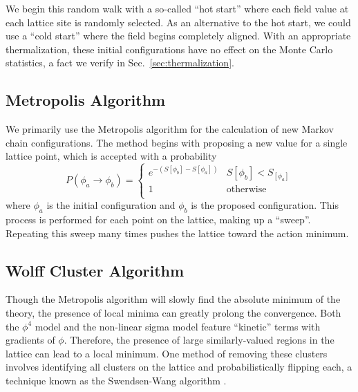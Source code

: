We begin this random walk with a so-called ``hot start'' where each field value at each lattice site is randomly selected. As an alternative to the hot start, we could use a ``cold start'' where the field begins completely aligned. With an appropriate thermalization, these initial configurations have no effect on the Monte Carlo statistics, a fact we verify in Sec.~\ref{sec:thermalization}. 

\subsection{Metropolis Algorithm}
We primarily use the Metropolis algorithm for the calculation of new Markov chain configurations. The method begins with proposing a new value for a single lattice point, which is accepted with a probability
\begin{equation}
    P(\phi_a\rightarrow\phi_b) = \begin{cases} 
        e^{-(S[\phi_b] - S[\phi_a])} & S[\phi_b] < S_[\phi_a] \\
        1 & \mathrm{otherwise} \\
   \end{cases}
\end{equation}
where $\phi_a$ is the initial configuration and $\phi_b$ is the proposed configuration. This process is performed for each point on the lattice, making up a ``sweep''. Repeating this sweep many times pushes the lattice toward the action minimum.


\subsection{Wolff Cluster Algorithm}
Though the Metropolis algorithm will slowly find the absolute minimum of the theory, the presence of local minima can greatly prolong the convergence. Both the $\phi^4$ model and the non-linear sigma model feature ``kinetic'' terms with gradients of $\phi$. Therefore, the presence of large similarly-valued regions in the lattice can lead to a local minimum. One method of removing these clusters involves identifying all clusters on the lattice and probabilistically flipping each, a technique known as the Swendsen-Wang algorithm \cite{swendsen1987}. 

